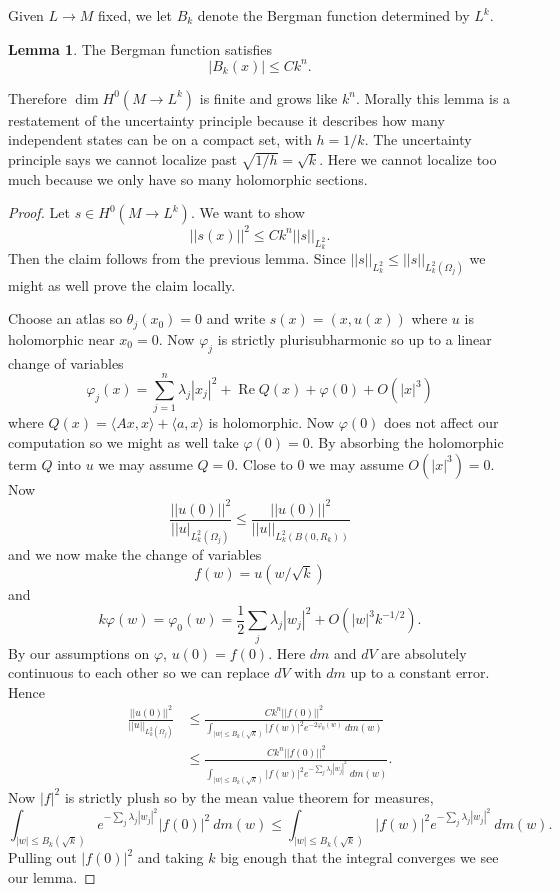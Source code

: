 \documentclass[12pt]{report}
\renewcommand{\Re}{\operatorname{Re}}
\theoremstyle{definition}
\newtheorem{lemma}[theorem]{Lemma}
\begin{document}
    Given $L \to M$ fixed, we let $B_k$ denote the Bergman function determined by $L^k$.
\begin{lemma}
    The Bergman function satisfies
    $$|B_k(x)| \leq Ck^n.$$
\end{lemma}
    Therefore $\dim H^0(M \to L^k)$ is finite and grows like $k^n$. Morally this lemma is a restatement of the uncertainty principle because it describes how many independent states can be on a compact set, with $h = 1/k$. The uncertainty principle says we cannot localize past $\sqrt{1/h} = \sqrt k$. Here we cannot localize too much because we only have so many holomorphic sections.
\begin{proof}
    Let $s \in H^0(M \to L^k)$. We want to show
    $$||s(x)||^2 \leq Ck^n ||s||_{L^2_k}.$$
    Then the claim follows from the previous lemma. Since $||s||_{L^2_k} \leq ||s||_{L^2_k(\Omega_j)}$ we might as well prove the claim locally.

    Choose an atlas so $\theta_j(x_0) = 0$ and write $s(x) = (x, u(x))$ where $u$ is holomorphic near $x_0 = 0$. Now $\varphi_j$ is strictly plurisubharmonic so up to a linear change of variables
    $$\varphi_j(x) = \sum_{j=1}^n \lambda_j|x_j|^2 + \Re Q(x) + \varphi(0) + O(|x|^3)$$
    where $Q(x) = \langle Ax, x\rangle + \langle a, x\rangle$ is holomorphic. Now $\varphi(0)$ does not affect our computation so we might as well take $\varphi(0) = 0$. By absorbing the holomorphic term $Q$ into $u$ we may assume $Q = 0$. Close to $0$ we may assume $O(|x|^3) = 0$. Now
    $$\frac{||u(0)||^2}{||u|_{L^2_k(\Omega_j)}} \leq \frac{||u(0)||^2}{||u||_{L^2_k(B(0, R_k))}}$$
    and we now make the change of variables
    $$f(w) = u(w/\sqrt k)$$
    and
    $$k\varphi(w) = \varphi_0(w) = \frac{1}{2}\sum_j \lambda_j |w_j|^2 + O(|w|^3k^{-1/2}).$$
    By our assumptions on $\varphi$, $u(0) = f(0)$. Here $dm$ and $dV$ are absolutely continuous to each other so we can replace $dV$ with $dm$ up to a constant error. Hence
\begin{align*}\frac{||u(0)||^2}{||u||_{L^2_k(\Omega_j)}} &\leq \frac{Ck^n||f(0)||^2}{\int_{|w| \leq B_k(\sqrt k)} |f(w)|^2 e^{-2\varphi_0(w)}  ~dm(w)} \\
    &\leq \frac{Ck^n||f(0)||^2}{\int_{|w| \leq B_k(\sqrt k)} |f(w)|^2 e^{-\sum_j \lambda_j|w_j|^2} ~dm(w)}.
\end{align*}
    Now $|f|^2$ is strictly plush so by the mean value theorem for measures,
$$\int_{|w| \leq B_k(\sqrt k)} e^{-\sum_j \lambda_j |w_j|^2} |f(0)|^2 ~dm(w) \leq \int_{|w| \leq B_k(\sqrt k)} |f(w)|^2 e^{-\sum_j \lambda_j |w_j|^2} ~dm(w).$$
    Pulling out $|f(0)|^2$ and taking $k$ big enough that the integral converges we see our lemma.
\end{proof}
\end{document}

